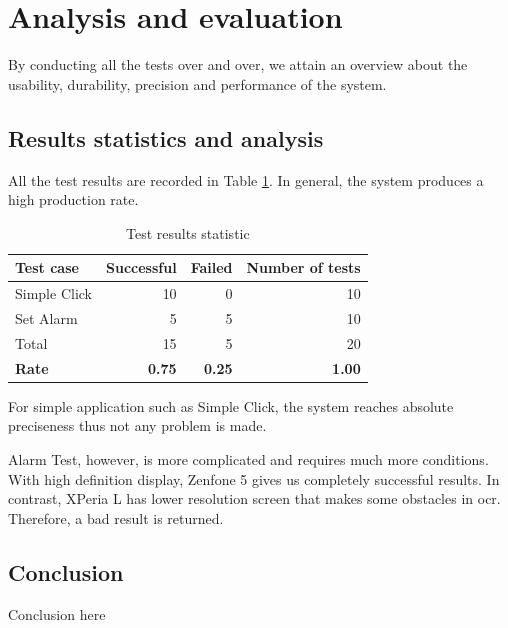 \section{Analysis and evaluation}
By conducting all the tests over and over, we attain an overview about the usability, durability, precision and performance of the system.

\subsection{Results statistics and analysis}
All the test results are recorded in Table \ref{tab:result_stat}. In general, the system produces a high production rate.

	\begin{table}[H]
		\centering
		\caption{Test results statistic}	
		\label{tab:result_stat}
		\begin{tabular}{|l|rrr|}
			\hline
			Test case & Successful & Failed & Number of tests \\
			\hline
			Simple Click & 10 & 0 & 10 \\
			Set Alarm & 5 & 5 & 10 \\
			\hline
			Total & 15 & 5 & 20 \\
			\hline
			\textbf{Rate} & \textbf{0.75} & \textbf{0.25} & \textbf{1.00} \\
			\hline
		\end{tabular}
	\end{table}

For simple application such as Simple Click, the system reaches absolute preciseness thus not any problem is made.

Alarm Test, however, is more complicated and requires much more conditions. With high definition display, Zenfone 5 gives us completely successful results. In contrast, XPeria L has lower resolution screen that makes some obstacles in \acrshort{ocr}. Therefore, a bad result is returned.

\subsection{Conclusion}
Conclusion here
